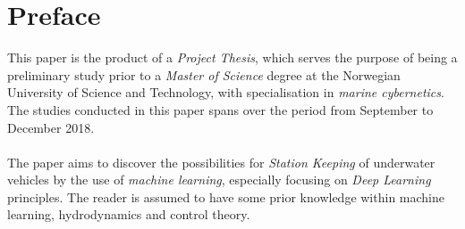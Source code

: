 \section*{Preface}
This paper is the product of a \textit{Project Thesis}, which serves the purpose of being a preliminary study prior to a \textit{Master of Science} degree at the Norwegian University of Science and Technology, with specialisation in \textit{marine cybernetics}. The studies conducted in this paper spans over the period from September to December 2018.\\\\The paper aims to discover the possibilities for \textit{Station Keeping} of underwater vehicles by the use of \textit{machine learning}, especially focusing on \textit{Deep Learning} principles. The reader is assumed to have some prior knowledge within machine learning, hydrodynamics and control theory. 